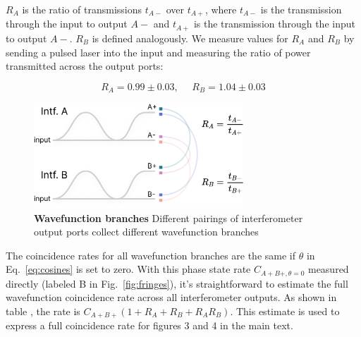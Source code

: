 \documentclass[11pt]{caltech_thesis} %
\begin{document}
$R_A$ is the ratio of transmissions $t_{A-}$ over $t_{A+}$, where $t_{A-}$ is the transmission through the input to output $A-$ and $t_{A+}$ is the transmission through the input to output $A-$. $R_B$ is defined analogously. We measure values for $R_A$ and $R_B$ by sending a pulsed laser into the input and measuring the ratio of power transmitted across the output ports:

$$R_A = 0.99 \pm 0.03, ~~~~~~ R_B = 1.04 \pm 0.03$$

\hypertarget{fig:branches}{%
\begin{figure}
\centering
\includegraphics[width=0.7\textwidth,height=\textheight]{./chapter_05/figs/branches_light.pdf}
\caption[{Wavefunction branches}]{\textbf{Wavefunction branches} Different pairings of interferometer output ports collect different wavefunction branches}
\label{fig:branches}
\end{figure}
}

The coincidence rates for all wavefunction branches are the same if $\theta$ in Eq.~\ref{eq:cosines} is set to zero. With this phase state rate $C_{A+ B+, \theta=0}$ measured directly (labeled B in Fig.~\ref{fig:fringes}), it's straightforward to estimate the full wavefunction coincidence rate across all interferometer outputs. As shown in table \textcite{table:rates}, the rate is $C_{A+ B+}(1 + R_A + R_B + R_AR_B)$. This estimate is used to express a full coincidence rate for figures 3 and 4 in the main text.
\end{document}
